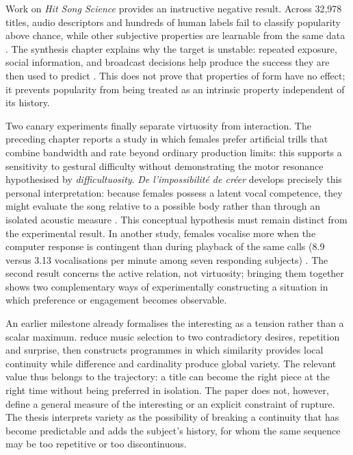 \documentclass[11pt,a4paper]{article}
\begin{document}
Work on \emph{Hit Song Science} provides an instructive negative result. Across
32,978 titles, audio descriptors and hundreds of human labels fail to classify
popularity above chance, while other subjective properties are learnable from
the same data \parencite{pachetroy2008hitsong}. The synthesis chapter explains
why the target is unstable: repeated exposure, social information, and broadcast
decisions help produce the success they are then used to predict
\parencite{pachet2011hitsong}. This does not prove that properties of form have
no effect; it prevents popularity from being treated as an intrinsic property
independent of its history.

Two canary experiments finally separate virtuosity from interaction. The
preceding chapter reports a study in which females prefer artificial trills that
combine bandwidth and rate beyond ordinary production limits: this supports a
sensitivity to gestural difficulty without demonstrating the motor resonance
hypothesised by \emph{difficultuosity}. \emph{De l'impossibilité de créer}
develops precisely this personal interpretation: because females possess a latent
vocal competence, they might evaluate the song relative to a possible body rather
than through an isolated acoustic measure \parencite{pachet2026impossibilite}.
This conceptual hypothesis must remain distinct from the experimental result. In
another study, females vocalise more
when the computer response is contingent than during playback of the same calls
(8.9 versus 3.13 vocalisations per minute among seven responding subjects)
\parencite{pachet2011hitsong,lerch2011closedloop}. The second result concerns the
active relation, not virtuosity; bringing them together shows two complementary
ways of experimentally constructing a situation in which preference or
engagement becomes observable.

An earlier milestone already formalises the interesting as a tension rather than a
scalar maximum. \textcite{pachet1999programs} reduce music selection to two
contradictory desires, repetition and surprise, then constructs programmes in which
similarity provides local continuity while difference and cardinality produce global
variety. The relevant value thus belongs to the trajectory: a title can become the
right piece at the right time without being preferred in isolation. The paper does not,
however, define a general measure of the interesting or an explicit constraint of
rupture. The thesis interprets variety as the possibility of breaking a continuity
that has become predictable and adds the subject's history, for whom the same sequence
may be too repetitive or too discontinuous.
\end{document}
